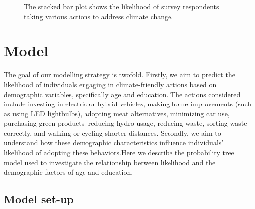 \documentclass[
  letterpaper,
  DIV=11,
  numbers=noendperiod]{scrartcl}
\begin{document}
\begin{figure}


\caption{\label{fig-nine}The stacked bar plot shows the likelihood of
survey respondents taking various actions to address climate change.}

\end{figure}%

\section{Model}\label{sec-model}

The goal of our modelling strategy is twofold. Firstly, we aim to
predict the likelihood of individuals engaging in climate-friendly
actions based on demographic variables, specifically age and education.
The actions considered include investing in electric or hybrid vehicles,
making home improvements (such as using LED lightbulbs), adopting meat
alternatives, minimizing car use, purchasing green products, reducing
hydro usage, reducing waste, sorting waste correctly, and walking or
cycling shorter distances. Secondly, we aim to understand how these
demographic characteristics influence individuals' likelihood of
adopting these behaviors.Here we describe the probability tree model
used to investigate the relationship between likelihood and the
demographic factors of age and education.

\subsection{Model set-up}\label{model-set-up}
\end{document}
